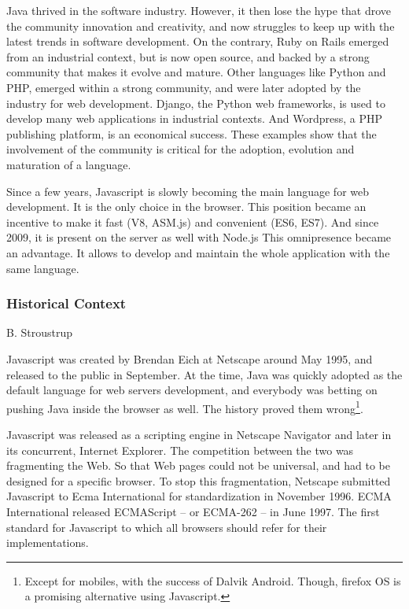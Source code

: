 Java thrived in the software industry.
However, it then lose the hype that drove the community innovation and creativity, and now struggles to keep up with the latest trends in software development.
On the contrary, Ruby on Rails emerged from an industrial context, but is now open source, and backed by a strong community that makes it evolve and mature.
Other languages like Python and PHP, emerged within a strong community, and were later adopted by the industry for web development.
Django, the Python web frameworks, is used to develop many web applications in industrial contexts.
And Wordpress, a PHP publishing platform, is an economical success.
These examples show that the involvement of the community is critical for the adoption, evolution and maturation of a language.

Since a few years, Javascript is slowly becoming the main language for web development.
It is the only choice in the browser.
This position became an incentive to make it fast (V8, ASM.js) and convenient (ES6, ES7).
And since 2009, it is present on the server as well with Node.js
This omnipresence became an advantage.
It allows to develop and maintain the whole application with the same language.

\subsubsection{Historical Context}

%
{B. Stroustrup}

Javascript was created by Brendan Eich at Netscape around May 1995, and released to the public in September.
At the time, Java was quickly adopted as the default language for web servers development, and everybody was betting on pushing Java inside the browser as well.
The history proved them wrong\footnote{Except for mobiles, with the success of Dalvik Android. Though, firefox OS is a promising alternative using Javascript.}.

Javascript was released as a scripting engine in Netscape Navigator and later in its concurrent, Internet Explorer.
The competition between the two was fragmenting the Web.
So that Web pages could not be universal, and had to be designed for a specific browser.
To stop this fragmentation, Netscape submitted Javascript to Ecma International for standardization in November 1996.
ECMA International released ECMAScript -- or ECMA-262 -- in June 1997.
The first standard for Javascript to which all browsers should refer for their implementations.

